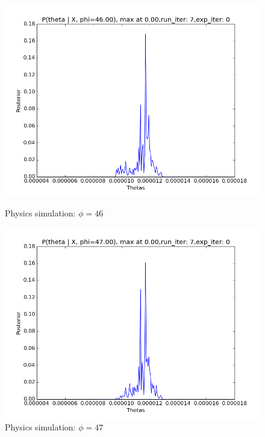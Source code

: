\documentclass[10pt,journal,compsoc]{IEEEtran}
\begin{document}
\begin{figure}
\begin{minipage}[b]{0.5\linewidth}
\includegraphics[width=1\linewidth]{PhysicsPlots/LP6.png} 
\caption{\label{fig:LP6}Physics simulation: $\phi=46$}
\vspace{1ex}
\end{minipage} 		
\begin{minipage}[b]{0.5\linewidth}
\centering
\includegraphics[width=1\linewidth]{PhysicsPlots/LP7.png} 
\caption{\label{fig:LP7}Physics simulation: $\phi=47$}
\vspace{1ex}
\end{minipage} 
\begin{minipage}[b]{0.5\linewidth}
\centering

\end{minipage}
\end{figure}
\end{document}

